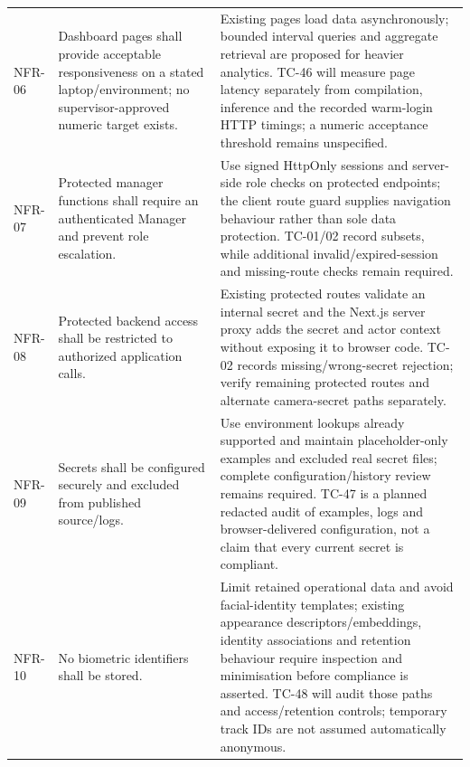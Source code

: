 \begin{longtable}{P{0.09\textwidth}P{0.30\textwidth}P{0.51\textwidth}}
NFR-06 & Dashboard pages shall provide acceptable responsiveness on a stated laptop/environment; no supervisor-approved numeric target exists. & Existing pages load data asynchronously; bounded interval queries and aggregate retrieval are proposed for heavier analytics. TC-46 will measure page latency separately from compilation, inference and the recorded warm-login HTTP timings; a numeric acceptance threshold remains unspecified.\\
NFR-07 & Protected manager functions shall require an authenticated Manager and prevent role escalation. & Use signed HttpOnly sessions and server-side role checks on protected endpoints; the client route guard supplies navigation behaviour rather than sole data protection. TC-01/02 record subsets, while additional invalid/expired-session and missing-route checks remain required.\\
NFR-08 & Protected backend access shall be restricted to authorized application calls. & Existing protected routes validate an internal secret and the Next.js server proxy adds the secret and actor context without exposing it to browser code. TC-02 records missing/wrong-secret rejection; verify remaining protected routes and alternate camera-secret paths separately.\\
NFR-09 & Secrets shall be configured securely and excluded from published source/logs. & Use environment lookups already supported and maintain placeholder-only examples and excluded real secret files; complete configuration/history review remains required. TC-47 is a planned redacted audit of examples, logs and browser-delivered configuration, not a claim that every current secret is compliant.\\
NFR-10 & No biometric identifiers shall be stored. & Limit retained operational data and avoid facial-identity templates; existing appearance descriptors/embeddings, identity associations and retention behaviour require inspection and minimisation before compliance is asserted. TC-48 will audit those paths and access/retention controls; temporary track IDs are not assumed automatically anonymous.\\
\bottomrule
\end{longtable}
